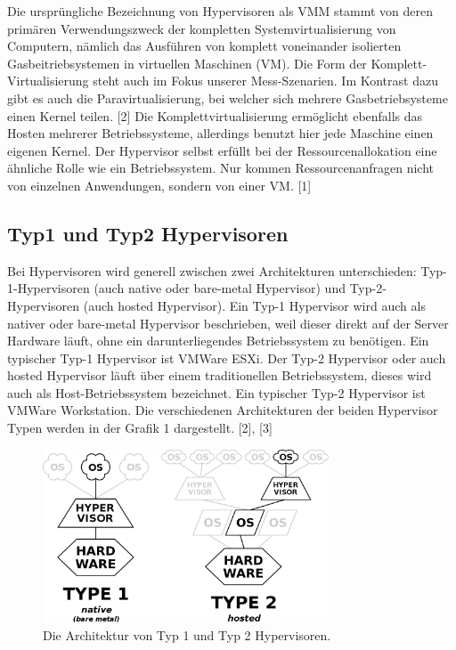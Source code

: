 \documentclass[conference]{IEEEtran}
\begin{document}
Die ursprüngliche Bezeichnung von Hypervisoren als VMM stammt von deren primären Verwendungszweck der kompletten Systemvirtualisierung von Computern, nämlich das Ausführen von komplett voneinander isolierten Gasbeitriebsystemen in virtuellen Maschinen (VM). Die Form der Komplett-Virtualisierung steht auch im Fokus unserer Mess-Szenarien. Im Kontrast dazu gibt es auch die Paravirtualisierung, bei welcher sich mehrere Gasbetriebsysteme einen Kernel teilen. [2] Die Komplettvirtualisierung ermöglicht ebenfalls das Hosten mehrerer Betriebssysteme, allerdings benutzt hier jede Maschine einen eigenen Kernel. Der Hypervisor selbst erfüllt bei der Ressourcenallokation eine ähnliche Rolle wie ein Betriebssystem. Nur kommen Ressourcenanfragen nicht von einzelnen Anwendungen, sondern von einer VM. [1]

\subsection{Typ1 und Typ2 Hypervisoren}
Bei Hypervisoren wird generell zwischen zwei Architekturen unterschieden: Typ-1-Hypervisoren (auch native oder bare-metal Hypervisor) und Typ-2-Hypervisoren (auch hosted Hypervisor). Ein Typ-1 Hypervisor wird auch als nativer oder bare-metal Hypervisor beschrieben, weil dieser direkt auf der Server Hardware läuft, ohne ein darunterliegendes Betriebssystem zu benötigen. Ein typischer Typ-1 Hypervisor ist VMWare ESXi. Der Typ-2 Hypervisor oder auch hosted Hypervisor läuft über einem traditionellen Betriebssystem, dieses wird auch als Host-Betriebssystem bezeichnet. Ein typischer Typ-2 Hypervisor ist VMWare Workstation. Die verschiedenen Architekturen der beiden Hypervisor Typen werden in der Grafik 1 dargestellt. [2], [3] 

\begin{figure}
	\centering
	\includegraphics[keepaspectratio,width=8.5cm,height=0.75\textheight]{hypervisors.png}
	\caption{Die Architektur von Typ 1 und Typ 2 Hypervisoren.}
	\label{architecture}
\end{figure}
\end{document}
